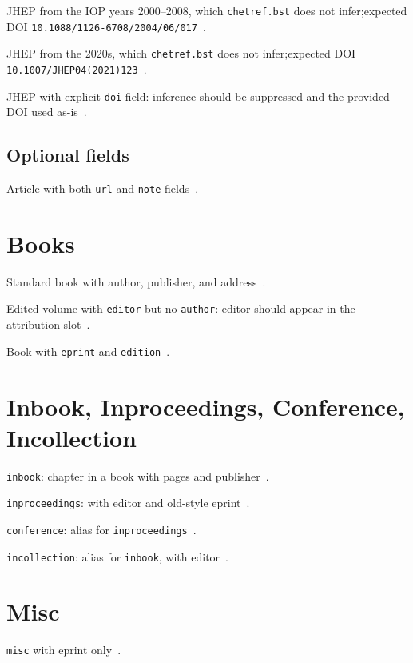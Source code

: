 \documentclass[12pt]{article}
\begin{document}
JHEP from the IOP years 2000--2008, which \texttt{chetref.bst} does not infer;\newline expected DOI \texttt{10.1088/1126-6708/2004/06/017}~\cite{jhep_iop_2004}.

JHEP from the 2020s, which \texttt{chetref.bst} does not infer;\newline expected DOI \texttt{10.1007/JHEP04(2021)123}~\cite{jhep_springer_2021}.

JHEP with explicit \texttt{doi} field: inference should be suppressed and the provided DOI used as-is~\cite{jhep_explicit_doi}.

\subsection{Optional fields}

Article with both \texttt{url} and \texttt{note} fields~\cite{with_url_note}.

\section{Books}

Standard book with author, publisher, and address~\cite{book_author}.

Edited volume with \texttt{editor} but no \texttt{author}: editor should appear in the attribution slot~\cite{book_editor}.

Book with \texttt{eprint} and \texttt{edition}~\cite{book_eprint}.

\section{Inbook, Inproceedings, Conference, Incollection}

\texttt{inbook}: chapter in a book with pages and publisher~\cite{inbook_example}.

\texttt{inproceedings}: with editor and old-style eprint~\cite{inproceedings_example}.

\texttt{conference}: alias for \texttt{inproceedings}~\cite{conference_example}.

\texttt{incollection}: alias for \texttt{inbook}, with editor~\cite{incollection_example}.

\section{Misc}

\texttt{misc} with eprint only~\cite{misc_preprint}.
\end{document}
